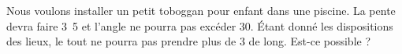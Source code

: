 
\begin{exercice}\label{exosmath-0470}

    Nous voulons installer un petit toboggan pour enfant dans une piscine. La pente devra faire \unit{3.5}{\meter} et l'angle ne pourra pas excéder \unit{30}{\degree}. Étant donné les dispositions des lieux, le tout ne pourra pas prendre plus de \unit{3}{\meter} de long. Est-ce possible ?

\end{exercice}
